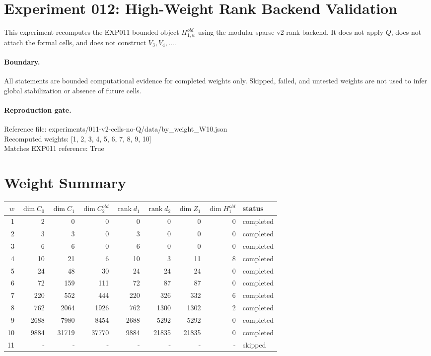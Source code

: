 \documentclass{article}
\begin{document}
\section*{Experiment 012: High-Weight Rank Backend Validation}
This experiment recomputes the EXP011 bounded object $H_{1,w}^{old}$ using the modular sparse v2 rank backend. It does not apply $Q$, does not attach the formal cells, and does not construct $V_3,V_4,\ldots$.
\paragraph{Boundary.}
All statements are bounded computational evidence for completed weights only. Skipped, failed, and untested weights are not used to infer global stabilization or absence of future cells.
\paragraph{Reproduction gate.}
Reference file: experiments/011-v2-cells-no-Q/data/by\_weight\_W10.json\\
Recomputed weights: [1, 2, 3, 4, 5, 6, 7, 8, 9, 10]\\
Matches EXP011 reference: True
\section*{Weight Summary}
\begin{longtable}{rrrrrrrrl}
\toprule $w$ & $\dim C_0$ & $\dim C_1$ & $\dim C_2^{old}$ & $\operatorname{rank} d_1$ & $\operatorname{rank} d_2$ & $\dim Z_1$ & $\dim H_1^{old}$ & status \\
\midrule
1 & 2 & 0 & 0 & 0 & 0 & 0 & 0 & completed \\
2 & 3 & 3 & 0 & 3 & 0 & 0 & 0 & completed \\
3 & 6 & 6 & 0 & 6 & 0 & 0 & 0 & completed \\
4 & 10 & 21 & 6 & 10 & 3 & 11 & 8 & completed \\
5 & 24 & 48 & 30 & 24 & 24 & 24 & 0 & completed \\
6 & 72 & 159 & 111 & 72 & 87 & 87 & 0 & completed \\
7 & 220 & 552 & 444 & 220 & 326 & 332 & 6 & completed \\
8 & 762 & 2064 & 1926 & 762 & 1300 & 1302 & 2 & completed \\
9 & 2688 & 7980 & 8454 & 2688 & 5292 & 5292 & 0 & completed \\
10 & 9884 & 31719 & 37770 & 9884 & 21835 & 21835 & 0 & completed \\
11 & - & - & - & - & - & - & - & skipped \\
\bottomrule
\end{longtable}
\end{document}
